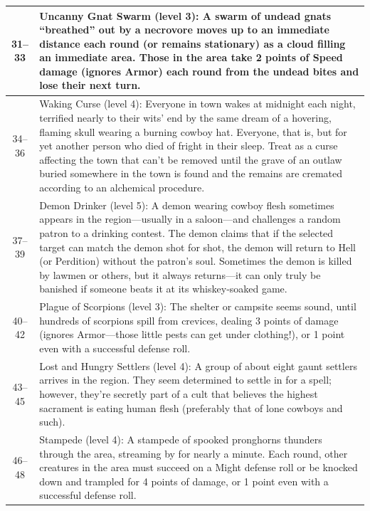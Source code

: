 \begin{longtable}{| c | p{15cm} |}
31–33 &  Uncanny Gnat Swarm (level 3): A swarm of undead gnats “breathed” out by a necrovore moves up to an immediate distance each round (or remains stationary) as a cloud filling an immediate area. Those in the area take 2 points of Speed damage (ignores Armor) each round from the undead bites and lose their next turn.  \\ \hline

34–36 &  Waking Curse (level 4): Everyone in town wakes at midnight each night, terrified nearly to their wits’ end by the same dream of a hovering, flaming skull wearing a burning cowboy hat. Everyone, that is, but for yet another person who died of fright in their sleep. Treat as a curse affecting the town that can’t be removed until the grave of an outlaw buried somewhere in the town is found and the remains are cremated according to an alchemical procedure. \\ \hline

37–39 &  Demon Drinker (level 5): A demon wearing cowboy flesh sometimes appears in the region—usually in a saloon—and challenges a random patron to a drinking contest. The demon claims that if the selected target can match the demon shot for shot, the demon will return to Hell (or Perdition) without the patron’s soul. Sometimes the demon is killed by lawmen or others, but it always returns—it can only truly be banished if someone beats it at its whiskey‑soaked game. \\ \hline

40–42 &  Plague of Scorpions (level 3): The shelter or campsite seems sound, until hundreds of scorpions spill from crevices, dealing 3 points of damage (ignores Armor—those little pests can get under clothing!), or 1 point even with a successful defense roll.  \\ \hline

43–45 &  Lost and Hungry Settlers (level 4): A group of about eight gaunt settlers arrives in the region. They seem determined to settle in for a spell; however, they’re secretly part of a cult that believes the highest sacrament is eating human flesh (preferably that of lone cowboys and such).  \\ \hline

46–48 &  Stampede (level 4): A stampede of spooked pronghorns thunders through the area, streaming by for nearly a minute. Each round, other creatures in the area must succeed on a Might defense roll or be knocked down and trampled for 4 points of damage, or 1 point even with a successful defense roll. \\ \hline


\end{longtable}
